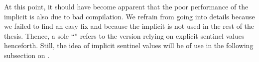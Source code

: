 At this point, it should have become apparent that the poor performance of the implicit \IS{} is also due to bad compilation.
We refrain from going into details because we failed to find an easy fix and because the implicit \IS{} is not used in the rest of the thesis.
Thence, a sole \enquote{\IS{}} refers to the version relying on explicit sentinel values henceforth.
Still, the idea of implicit sentinel values will be of use in the following subsection on \ShS{}.

\raggedbottom
